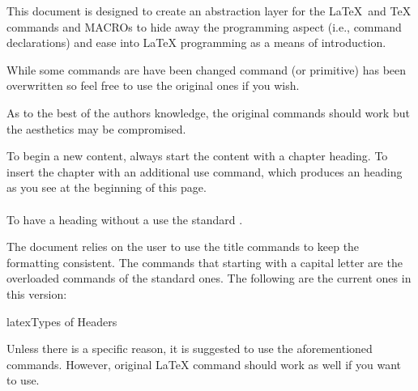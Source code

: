 \documentclass[minted, draw, cover = contour]{../tex/hebdomon}
\begin{document}
% 
\MakeTitle
\CopyRight
\StudentDeclaration

\tableofcontents
\newpage


This document is designed to create an abstraction layer for the \LaTeX\, and \TeX\,
commands and MACROs to hide away the programming aspect (i.e., command declarations) and
ease into LaTeX programming as a means of introduction.

While some commands are have been changed  command (or primitive) has been
overwritten so feel free to use the original ones if you wish.

\begin{warning}
	As to the best of the authors knowledge, the original commands should work
	but the aesthetics may be compromised.
\end{warning}


To begin a new content, always start the content with a chapter heading. To
insert the chapter with an additional 
use \pcode{\Chapter} command, which produces an heading as
you see at the beginning of this page.
\\\\
To have a heading without a  use the standard \pcode{\chapter}.

The document relies on the user to use the  title commands to
keep the formatting consistent. The commands that starting with a
capital letter are the overloaded commands of the standard ones.
The following are the current ones in this version:
%
\begin{Code}{latex}{Types of Headers}
\end{Code}
%
\begin{warning}
	Unless there is a specific reason, it is suggested to use the aforementioned
	commands. However, original LaTeX command should work as well if you want to use.
\end{warning}
\end{document}
